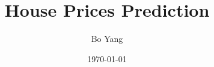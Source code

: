 \documentclass{amsart}
\begin{document}
%
%
\title[A Short Running Title]{House Prices Prediction}%

\author{Bo Yang}
\address[A.~1]{School of Computer Science,\\ 
Xi'an Shiyou University, Shaanxi 710065, China}%




%
\date{\today}




\maketitle
\tableofcontents

\newpage



%
%

\end{document}
